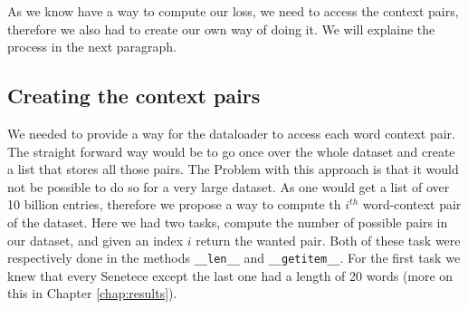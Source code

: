 As we know have a way to compute our loss, we need to access the context pairs, therefore we also had to create our own way of doing it. We will explaine the process in the next paragraph.

\subsection{Creating the context pairs}
We needed to provide a way for the dataloader to access each word context pair. The straight forward way would be to go once over the whole dataset and create a list that stores all those pairs. The Problem with this approach is that it would not be possible to do so for a very large dataset. As one would get a list of over 10 billion entries, therefore we propose a way to compute th $i^{th}$ word-context pair of the dataset. Here we had two tasks, compute the number of possible pairs in our dataset, and given an index $i$ return the wanted pair. Both of these task were respectively done in the methods \texttt{\_\_len\_\_} and \texttt{\_\_getitem\_\_}.
For the first task we knew that every Senetece except the last one had a length of 20 words (more on this in Chapter \ref{chap:results}). 
